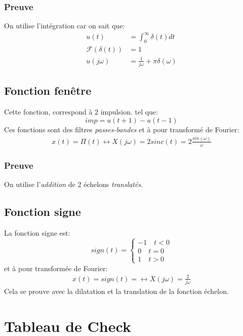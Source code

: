 \documentclass{report}
\begin{document}
\subsubsection{Preuve}
On utilise l'intégration car on sait que:
\begin{align*}
u(t) &=  \int_0^{\infty} \delta(t) dt\\
\mathcal{F}(\delta(t)) &= 1\\
u(j\omega) &= \frac{1}{j \omega} + \pi \delta(\omega)
\end{align*}

\subsection{Fonction fenêtre}
Cette fonction, correspond à 2 impulsion. tel que:
\begin{equation}
imp = u(t+1) - u(t-1)
\end{equation}
Ces fonctions sont des filtres \textit{passes-bandes} et à pour transformé de Fourier:
\begin{align*}
x(t) = \Pi (t) \longleftrightarrow X(j\omega) = 2 sinc(t) = 2\frac{sin(\omega)}{\omega}
\end{align*}

\subsubsection{Preuve}
On utilise l'\textit{addition} de 2 échelons \textit{translatés}.

\subsection{Fonction signe}
La fonction signe est:
\begin{equation}
sign(t) = \begin{cases}
-1 \quad t < 0\\
0 \quad t = 0\\
1 \quad t > 0
\end{cases}
\end{equation}
et à pour transformée de Fourier:
\begin{align*}
x(t) = sign(t) = \longleftrightarrow X(j\omega) = \frac{2}{j\omega}
\end{align*}
Cela se prouve avec la dilatation et la translation de la fonction échelon.

\section{Tableau de Check}
\end{document}
